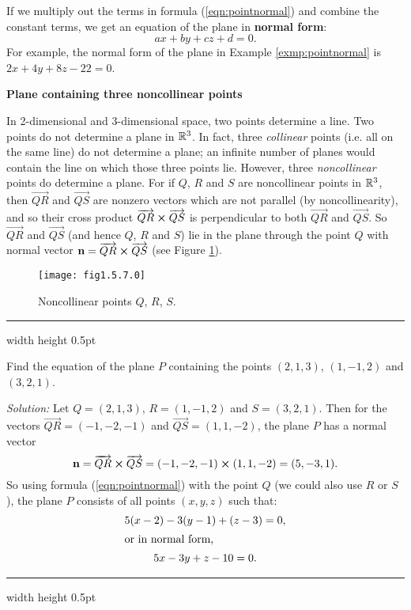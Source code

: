 If we multiply out the terms in formula (\ref{eqn:pointnormal}) and combine the constant terms, we get an
equation of the plane in \textbf{normal form}:
\begin{equation}
 ax + by + cz + d = 0.
\end{equation}
For example, the normal form of the plane in Example \ref{exmp:pointnormal} is $2x + 4y + 8z - 22 = 0$.
\pagebreak[3]
\par\noindent\textbf{\large{Plane containing three noncollinear points}}\normalsize\smallskip

In 2-dimensional and 3-dimensional space, two points determine a line. Two points do not determine a plane in
$\mathbb{R}^{3}$. 
In fact, three \emph{collinear} points (i.e. all on the same line)
do not determine a plane; an infinite number of planes would contain the line on which those three points lie.
However, three \emph{noncollinear} points do determine a plane. For if $Q$, $R$ and $S$ are noncollinear points in
$\mathbb{R}^{3}$, then $\overrightarrow{QR}$ and $\overrightarrow{QS}$ are  nonzero vectors which are not parallel (by
noncollinearity), and so their cross product $\overrightarrow{QR} \bm{\times} \overrightarrow{QS}$ is perpendicular to
both $\overrightarrow{QR}$ and $\overrightarrow{QS}$. So $\overrightarrow{QR}$ and
$\overrightarrow{QS}$ (and hence $Q$, $R$ and $S$) lie in the plane through the point $Q$ with normal vector
$\textbf{n} = \overrightarrow{QR} \bm{\times} \overrightarrow{QS}$ (see Figure \ref{fig:plane3pts}).

\begin{figure}[h]
 \begin{center}
  \texttt{[image: fig1.5.7.0]}
 \end{center}
 \caption[]{\quad Noncollinear points $Q$, $R$, $S$.}
 \label{fig:plane3pts}
\end{figure}

\hrule width \textwidth height 0.5pt
\begin{exmp}\label{exmp:plane3pts}
 Find the equation of the plane $P$ containing the points $(2,1,3)$, $(1,-1,2)$ and $(3,2,1)$.\smallskip
 \par\noindent\emph{Solution:} Let $Q = (2,1,3)$, $R = (1,-1,2)$ and $S = (3,2,1)$. Then for the vectors
 $\overrightarrow{QR} = (-1,-2,-1)$ and $\overrightarrow{QS} = (1,1,-2)$, the plane $P$ has a normal vector
 \begin{displaymath}
  \textbf{n} = \overrightarrow{QR} \bm{\times} \overrightarrow{QS} = (-1,-2,-1) \bm{\times} (1,1,-2) = (5,-3,1).
 \end{displaymath}
 So using formula (\ref{eqn:pointnormal}) with the point $Q$ (we could also use $R$ or $S$), the plane $P$ consists of
 all points $(x,y,z)$ such that:
 \begin{gather*}
  5(x - 2) - 3(y - 1) + (z - 3) = 0,\\
  \intertext{or in normal form,}
  5x - 3y + z - 10 = 0.
 \end{gather*}
\end{exmp}
\hrule width \textwidth height 0.5pt
\smallskip

